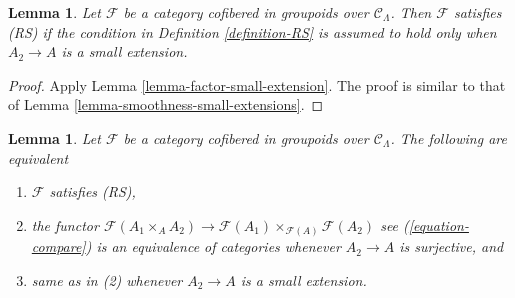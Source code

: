 \documentclass{stacks-project}
\theoremstyle{plain}
\newtheorem{lemma}[subsection]{Lemma}
\theoremstyle{definition}
\theoremstyle{remark}
\numberwithin{equation}{subsection}
\begin{document}
\begin{lemma}
\label{lemma-RS-small-extension}
Let $\mathcal{F}$ be a category cofibered in groupoids over $\mathcal
C_\Lambda$. Then $\mathcal{F}$ satisfies (RS) if the condition in
Definition \ref{definition-RS} is assumed to hold only when $A_2 \to A$
is a small extension.
\end{lemma}

\begin{proof}
Apply Lemma \ref{lemma-factor-small-extension}.  The proof is similar to that
of Lemma \ref{lemma-smoothness-small-extensions}.
\end{proof}

\begin{lemma}
\label{lemma-RS-2-categorical}
Let $\mathcal{F}$ be a category cofibered in groupoids over
$\mathcal{C}_\Lambda$. The following are equivalent
\begin{enumerate}
\item $\mathcal{F}$ satisfies (RS),
\item the functor
$\mathcal{F}(A_1 \times_A A_2) \to
\mathcal{F}(A_1) \times_{\mathcal{F}(A)} \mathcal{F}(A_2)$
see (\ref{equation-compare}) is an equivalence of
categories whenever $A_2 \to A$ is surjective, and
\item same as in (2) whenever $A_2 \to A$ is a small extension.
\end{enumerate}
\end{lemma}
\end{document}
